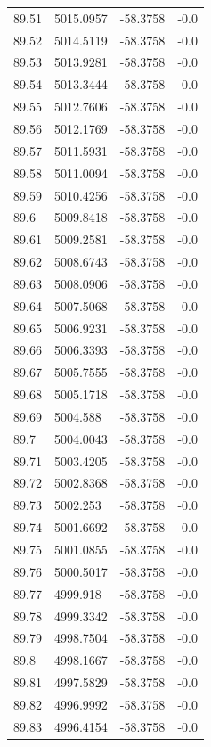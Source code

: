 \begin{table}[H]
\begin{tabular}{llll}
89.51 & 5015.0957 & -58.3758 & -0.0 \\
89.52 & 5014.5119 & -58.3758 & -0.0 \\
89.53 & 5013.9281 & -58.3758 & -0.0 \\
89.54 & 5013.3444 & -58.3758 & -0.0 \\
89.55 & 5012.7606 & -58.3758 & -0.0 \\
89.56 & 5012.1769 & -58.3758 & -0.0 \\
89.57 & 5011.5931 & -58.3758 & -0.0 \\
89.58 & 5011.0094 & -58.3758 & -0.0 \\
89.59 & 5010.4256 & -58.3758 & -0.0 \\
89.6 & 5009.8418 & -58.3758 & -0.0 \\
89.61 & 5009.2581 & -58.3758 & -0.0 \\
89.62 & 5008.6743 & -58.3758 & -0.0 \\
89.63 & 5008.0906 & -58.3758 & -0.0 \\
89.64 & 5007.5068 & -58.3758 & -0.0 \\
89.65 & 5006.9231 & -58.3758 & -0.0 \\
89.66 & 5006.3393 & -58.3758 & -0.0 \\
89.67 & 5005.7555 & -58.3758 & -0.0 \\
89.68 & 5005.1718 & -58.3758 & -0.0 \\
89.69 & 5004.588 & -58.3758 & -0.0 \\
89.7 & 5004.0043 & -58.3758 & -0.0 \\
89.71 & 5003.4205 & -58.3758 & -0.0 \\
89.72 & 5002.8368 & -58.3758 & -0.0 \\
89.73 & 5002.253 & -58.3758 & -0.0 \\
89.74 & 5001.6692 & -58.3758 & -0.0 \\
89.75 & 5001.0855 & -58.3758 & -0.0 \\
89.76 & 5000.5017 & -58.3758 & -0.0 \\
89.77 & 4999.918 & -58.3758 & -0.0 \\
89.78 & 4999.3342 & -58.3758 & -0.0 \\
89.79 & 4998.7504 & -58.3758 & -0.0 \\
89.8 & 4998.1667 & -58.3758 & -0.0 \\
89.81 & 4997.5829 & -58.3758 & -0.0 \\
89.82 & 4996.9992 & -58.3758 & -0.0 \\
89.83 & 4996.4154 & -58.3758 & -0.0 \\

\end{tabular}
\end{table}
